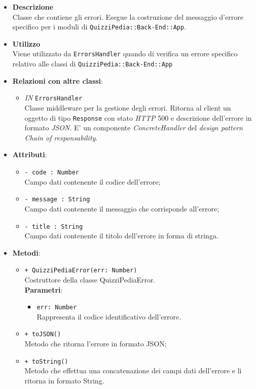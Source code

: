 	\begin{itemize}
		\item \textbf{Descrizione} \\
		Classe che contiene gli errori. Esegue la costruzione del messaggio d'errore specifico per i moduli di \texttt{QuizziPedia::Back-End::App}.
		\item \textbf{Utilizzo} \\
		Viene utilizzato da \texttt{ErrorsHandler} quando di verifica un errore specifico relativo alle classi di \texttt{QuizziPedia::Back-End::App}
		\item \textbf{Relazioni con altre classi}:
			 \begin{itemize}
			 	\item \textit{IN} \texttt{ErrorsHandler} \\
			 	Classe middleware per la gestione degli errori. Ritorna al client un oggetto di tipo \texttt{Response} con stato \textit{HTTP} 500 e descrizione dell'errore in formato \textit{JSON}. E' un componente \textit{ConcreteHandler} del \textit{design pattern} \textit{Chain of responsability}.
			 \end{itemize}
		\item \textbf{Attributi}:
			 \begin{itemize}
			 	\item \texttt{- code : Number}\\
			 	Campo dati contenente il codice dell'errore;
			 	\item \texttt{- message : String}\\
			 	Campo dati contenente il messaggio che corrisponde all'errore;
			 	\item \texttt{- title : String}\\
			 	Campo dati contenente il titolo dell'errore in forma di stringa.
			 \end{itemize}
		\item \textbf{Metodi}:
			\begin{itemize}
				\item \texttt{+ QuizziPediaError(err: Number)}\\
				Costruttore della classe QuizziPediaError.\\
				\textbf{Parametri}:
				\begin{itemize}
					\item \texttt{err: Number}\\
					Rappresenta il codice identificativo dell'errore.
				\end{itemize}
				\item \texttt{+ toJSON()}\\
				Metodo che ritorna l'errore in formato JSON;
				\item \texttt{+ toString()}\\
				Metodo che effettua una concatenazione dei campi dati dell'errore e li ritorna in formato String.
			\end{itemize}
	\end{itemize}